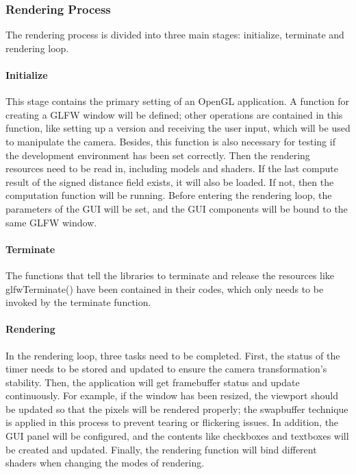 \subsubsection{Rendering Process}
\label{ds:rendering}

The rendering process is divided into three main stages: initialize, terminate and rendering loop.

\paragraph{Initialize}

This stage contains the primary setting of an OpenGL application. A function for creating a GLFW window will be defined; other operations are contained in this function, like setting up a version and receiving the user input, which will be used to manipulate the camera. Besides, this function is also necessary for testing if the development environment has been set correctly. Then the rendering resources need to be read in, including models and shaders. If the last compute result of the signed distance field exists, it will also be loaded. If not, then the computation function will be running. Before entering the rendering loop, the parameters of the GUI will be set, and the GUI components will be bound to the same GLFW window.

\paragraph{Terminate}

The functions that tell the libraries to terminate and release the resources like glfwTerminate() have been contained in their codes, which only needs to be invoked by the terminate function.

\paragraph{Rendering}

In the rendering loop, three tasks need to be completed. First, the status of the timer needs to be stored and updated to ensure the camera transformation's stability. Then, the application will get framebuffer status and update continuously. For example, if the window has been resized, the viewport should be updated so that the pixels will be rendered properly; the swapbuffer technique \cite{Framebuffer} is applied in this process to prevent tearing or flickering issues. In addition, the GUI panel will be configured, and the contents like checkboxes and textboxes will be created and updated. Finally, the rendering function will bind different shaders when changing the modes of rendering.